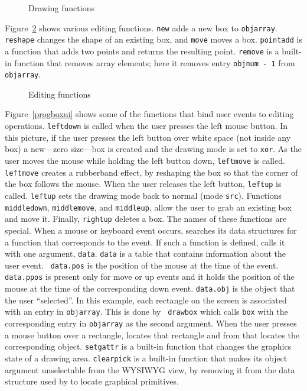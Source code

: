 \begin{figure}[htb]

\vspace{-12pt}
\caption{Drawing functions}
\label{progboxdraw}
\end{figure}

Figure~\ref{progboxedit} shows various editing functions. {\tt new} adds a new
box to {\tt objarray}. {\tt reshape} changes the shape of an existing box, and
{\tt move} moves a box. {\tt pointadd} is a function that adds two points and
returns the resulting point. {\tt remove} is a built-in function that removes
array elements; here it removes entry {\tt objnum - 1} from {\tt objarray}.

\begin{figure}[htb]

\vspace{-12pt}
\caption{Editing functions}
\label{progboxedit}
\end{figure}

Figure~\ref{progboxui} shows some of the functions that bind user events to
editing operations. {\tt leftdown} is called when the user presses the left
mouse button. In this picture, if the user presses the left button over white
space (not inside any box) a new---zero size---box is created and the drawing
mode is set to {\tt xor}. As the user moves the mouse while holding the left
button down, {\tt leftmove} is called. {\tt leftmove} creates a rubberband
effect, by reshaping the box so that the corner of the box follows the mouse.
When the user releases the left button, {\tt leftup} is called. {\tt leftup}
sets the drawing mode back to normal (mode {\tt src}). Functions {\tt
middledown}, {\tt middlemove}, and {\tt middleup}, allow the user to grab an
existing box and move it. Finally, {\tt rightup} deletes a box. The names of
these functions are special. When a mouse or keyboard event occurs, {\LEFTY}
searches its data structures for a function that corresponds to the event. If
such a function is defined, {\LEFTY} calls it with one argument, {\tt data}.
{\tt data} is a table that contains information about the user event.  {\tt
data.pos} is the position of the mouse at the time of the event.  {\tt
data.ppos} is present only for move or up events and it holds the position of
the mouse at the time of the corresponding down event. {\tt data.obj} is the
object that the user ``selected''. In this example, each rectangle on the
screen is associated with an entry in {\tt objarray}. This is done by {\tt
drawbox} which calls {\tt box} with the corresponding entry in {\tt objarray}
as the second argument. When the user presses a mouse button over a rectangle,
{\LEFTY} locates that rectangle and from that locates the corresponding object.
{\tt setgattr} is a built-in function that changes the graphics state of a
drawing area. {\tt clearpick} is a built-in function that makes its object
argument unselectable from the WYSIWYG view, by removing it from the data
structure used by {\LEFTY} to locate graphical primitives.

